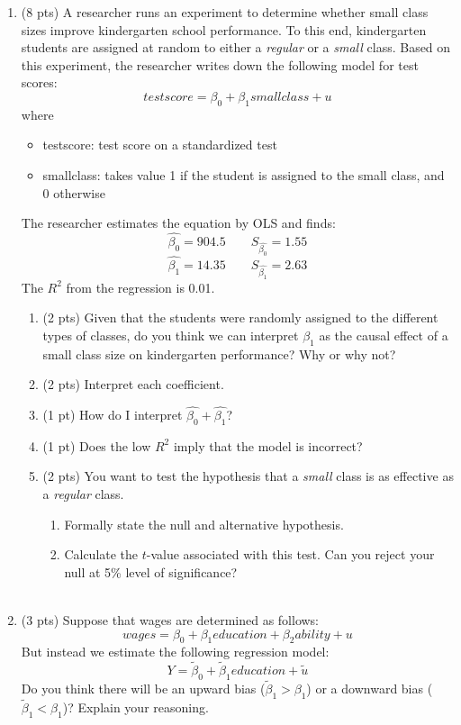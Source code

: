 \documentclass{./../../Latex/tests}
\begin{document}
\begin{enumerate}
\newpage 
\item (8 pts) A researcher runs an experiment to determine whether small class sizes improve kindergarten school performance. To this end, kindergarten students are assigned at random to either a \textit{regular} or a \textit{small} class. Based on this experiment, the researcher writes down the following model for test scores:
 $$ testscore = \beta_0 + \beta_1 smallclass + u $$
 where 
\begin{itemize}
  \item[] testscore: test score on a standardized test
  \item[] smallclass: takes value 1 if the student is assigned to the small class, and 0 otherwise
\end{itemize}
The researcher estimates the equation by OLS and finds:
$$ \hat{\beta_0} = 904.5 \quad \quad S_{\hat{\beta_0}} = 1.55 $$
$$ \hat{\beta_1} = 14.35 \quad \quad S_{\hat{\beta_1}} = 2.63 $$
The $R^2$ from the regression is 0.01. 

\begin{enumerate}
  \item (2 pts) Given that the students were randomly assigned to the different types of classes, do you think we can interpret $\beta_1$ as the causal effect of a small class size on kindergarten performance? Why or why not?
  \item (2 pts) Interpret each coefficient.
  \item (1 pt) How do I interpret $\hat{\beta_0}+\hat{\beta_1}$?
  \item (1 pt) Does the low $R^2$ imply that the model is incorrect?
  \item (2 pts) You want to test the hypothesis that a \textit{small} class is as effective as a \textit{regular} class. 
  \begin{enumerate}
  \item Formally state the null and alternative hypothesis. 
  \item Calculate the $t$-value associated with this test. Can you reject your null at 5\% level of significance? \\~\\
\end{enumerate}  
\end{enumerate}

\newpage 
 \item (3 pts) Suppose that wages are determined as follows:
  $$ wages = \beta_0 + \beta_1 education + \beta_2 ability  + u $$
  But instead we estimate the following regression model:
  $$ Y = \tilde{\beta}_0 + \tilde{\beta}_1 education  + \tilde{u} $$
Do you think there will be an upward bias ($\tilde{\beta}_1>\beta_1$) or a downward bias ($\tilde{\beta}_1<\beta_1$)? Explain your reasoning. \\~\\


\end{enumerate}
\end{document}
